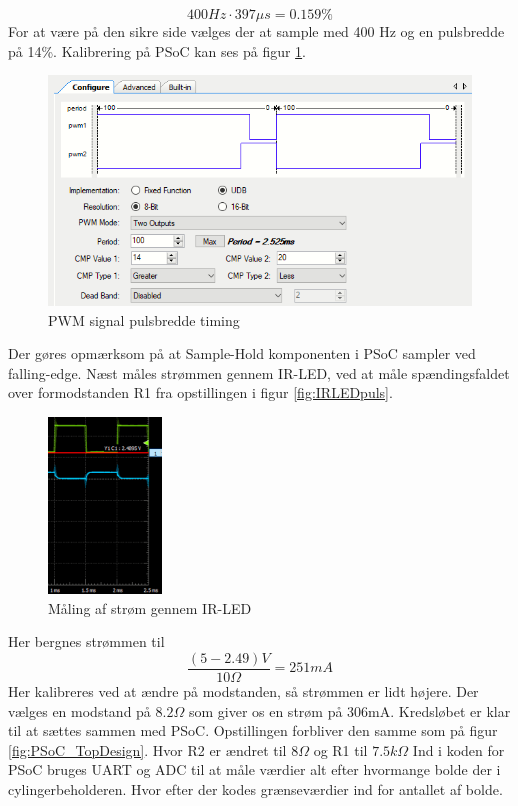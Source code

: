 \documentclass[HardwareDesign/HardwareDesign_main.tex]{subfiles}
\begin{document}
$$400Hz\cdot 397\mu s=0.159\%$$
For at være på den sikre side vælges der at sample med 400 Hz og en pulsbredde på 14\%. Kalibrering på PSoC kan ses på figur \ref{fig:PWM_timing}.
\begin{figure}[H]
    \centering
    \includegraphics[width=1\textwidth]{Rapport/BallDispenser/BallCountSensor/graphics/PWM_timing.png}
    \caption{PWM signal pulsbredde timing}
    \label{fig:PWM_timing}
\end{figure}
Der gøres opmærksom på at Sample-Hold komponenten i PSoC sampler ved falling-edge. Næst måles strømmen gennem IR-LED, ved at måle spændingsfaldet over formodstanden R1 fra opstillingen i figur \ref{fig:IRLEDpuls}.
\begin{figure}[H]
    \centering
    \includegraphics[width=0.27\textwidth]{Rapport/BallDispenser/BallCountSensor/graphics/Maling2.png}
    \caption{Måling af strøm gennem IR-LED}
    \label{fig:Måling2_AD}
\end{figure}
Her bergnes strømmen til 
$$\frac{(5-2.49)V}{10\Omega}=251mA$$
Her kalibreres ved at ændre på modstanden, så strømmen er lidt højere. Der vælges en modstand på $8.2\Omega$ som giver os en strøm på 306mA.
Kredsløbet er klar til at sættes sammen med PSoC. Opstillingen forbliver den samme som på figur \ref{fig:PSoC_TopDesign}. Hvor R2 er ændret til $8\Omega$ og R1 til $7.5k\Omega$
Ind i koden for PSoC bruges UART og ADC til at måle værdier alt efter hvormange bolde der i cylingerbeholderen. Hvor efter der kodes grænseværdier ind for antallet af bolde.
\end{document}
